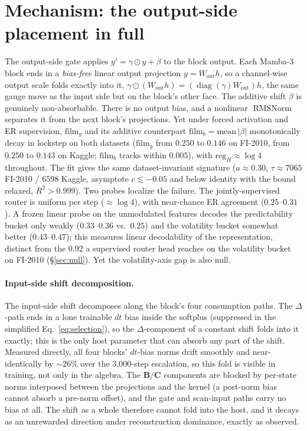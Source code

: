 \documentclass{article}
\DeclareMathOperator{\diagop}{diag}
\newcommand{\diag}{\diagop}
\DeclareMathOperator{\RMSNorm}{RMSNorm}
\begin{document}
\section{Mechanism: the output-side placement in full}\label{app:mech}

The output-side gate applies $y'=\gamma\odot y+\beta$ to the block output. Each
Mamba-3 block ends in a \emph{bias-free} linear output projection
$y=W_{\text{out}}h$, so a channel-wise output scale folds exactly into it,
$\gamma\odot(W_{\text{out}}h)=(\diag(\gamma)W_{\text{out}})h$, the same gauge move
as the input side but on the block's other face. The additive shift $\beta$ is
genuinely non-absorbable. There is no output bias, and a nonlinear $\RMSNorm$
separates it from the next block's projections. Yet under forced activation and ER
supervision, $\mathrm{film}_g$ and its additive counterpart
$\mathrm{film}_b=\mathrm{mean}\,|\beta|$ monotonically decay in lockstep on
both datasets ($\mathrm{film}_g$ from $0.250$ to $0.146$ on FI-2010, from $0.250$
to $0.143$ on Kaggle; $\mathrm{film}_b$ tracks within $0.005$), with
$\mathrm{reg}_H\approx\log 4$ throughout. The fit gives the same dataset-invariant signature ($a\approx0.30$,
$\tau\approx7065$ FI-2010 / $6598$ Kaggle, asymptote $c\lesssim-0.05$ and below
identity with the bound relaxed, $R^2>0.999$).
Two probes localize the failure. The jointly-supervised router is uniform per
step ($\approx\log 4$), with near-chance ER agreement ($0.25$--$0.31$). A frozen
linear probe on the unmodulated features decodes the predictability bucket only
weakly ($0.33$--$0.36$ vs.\ $0.25$) and the volatility bucket somewhat better
($0.43$--$0.47$); this measures linear decodability of the representation, distinct
from the $0.92$ a supervised router head reaches on the volatility bucket on
FI-2010 (\S\ref{sec:null}). Yet the volatility-axis gap is also null.

\paragraph{Input-side shift decomposition.}
The input-side shift decomposes along the block's four consumption paths. The
$\Delta$-path ends in a lone trainable $dt$ bias inside the softplus (suppressed
in the simplified Eq.~\eqref{eq:selection}), so the $\Delta$-component of a
constant shift folds into it exactly; this is the only host parameter that can
absorb any part of the shift. Measured directly, all four blocks' $dt$-bias norms
drift smoothly and near-identically by ${\sim}26\%$ over the 3{,}000-step
escalation, so this fold is visible in training, not only in the algebra. The
$\mathbf{B}/\mathbf{C}$ components are blocked
by per-state norms interposed between the projections and the kernel (a post-norm
bias cannot absorb a pre-norm offset), and the gate and scan-input paths carry no
bias at all. The shift as a whole therefore cannot fold into the host, and it
decays as an unrewarded direction under reconstruction dominance, exactly as
observed.
\end{document}

